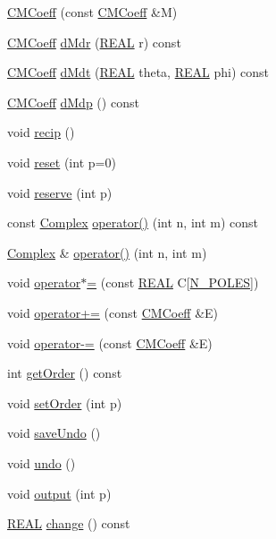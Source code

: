 \begin{DoxyCompactItemize}
\item 
\hyperlink{classCMCoeff_ae5a7fcbb8f989dbbff71d79738fd9356}{C\-M\-Coeff} (const \hyperlink{classCMCoeff}{C\-M\-Coeff} \&M)
\item 
\hyperlink{classCMCoeff}{C\-M\-Coeff} \hyperlink{classCMCoeff_aab926cdd2ef1a0f188f82603108296a8}{d\-Mdr} (\hyperlink{util_8h_a5821460e95a0800cf9f24c38915cbbde}{R\-E\-A\-L} r) const 
\item 
\hyperlink{classCMCoeff}{C\-M\-Coeff} \hyperlink{classCMCoeff_a2e9e6517ed48d1758af058f95b5af50c}{d\-Mdt} (\hyperlink{util_8h_a5821460e95a0800cf9f24c38915cbbde}{R\-E\-A\-L} theta, \hyperlink{util_8h_a5821460e95a0800cf9f24c38915cbbde}{R\-E\-A\-L} phi) const 
\item 
\hyperlink{classCMCoeff}{C\-M\-Coeff} \hyperlink{classCMCoeff_a3457ae837d9f8d250757fae3fd69c441}{d\-Mdp} () const 
\item 
void \hyperlink{classCMCoeff_a6e7e750022bf6a6f32dff9092881647c}{recip} ()
\item 
void \hyperlink{classCMCoeff_a5fc4a2ee0ab437bd601fd67ccc5bd43b}{reset} (int p=0)
\item 
void \hyperlink{classCMCoeff_a10d5db85d700255768d091c10fda818c}{reserve} (int p)
\item 
const \hyperlink{util_8h_a0ef19d29521fc1e3356ea268ba175cfc}{Complex} \hyperlink{classCMCoeff_a8776dd638fca3d95f813acb93c7896c7}{operator()} (int n, int m) const 
\item 
\hyperlink{util_8h_a0ef19d29521fc1e3356ea268ba175cfc}{Complex} \& \hyperlink{classCMCoeff_ad6668675df0fa31437bebee2a2b00e0f}{operator()} (int n, int m)
\item 
void \hyperlink{classCMCoeff_a63d33423be766832461e5e20a0f21f66}{operator$\ast$=} (const \hyperlink{util_8h_a5821460e95a0800cf9f24c38915cbbde}{R\-E\-A\-L} C\mbox{[}\hyperlink{mcoeff_8h_ac23f9c13c5d07d9ce386f7a830c35e5a}{N\-\_\-\-P\-O\-L\-E\-S}\mbox{]})
\item 
void \hyperlink{classCMCoeff_ac889bdd0230f6c3f11b8af06915410fe}{operator+=} (const \hyperlink{classCMCoeff}{C\-M\-Coeff} \&E)
\item 
void \hyperlink{classCMCoeff_a28161819e17994b61395e9ddc8532040}{operator-\/=} (const \hyperlink{classCMCoeff}{C\-M\-Coeff} \&E)
\item 
int \hyperlink{classCMCoeff_a4ca84260f5a63a33547ebce310b21c32}{get\-Order} () const 
\item 
void \hyperlink{classCMCoeff_a815a4d1f74b217ea54d9f05f6734004f}{set\-Order} (int p)
\item 
void \hyperlink{classCMCoeff_a99771333750460a0ba9c97f03bdaa6b9}{save\-Undo} ()
\item 
void \hyperlink{classCMCoeff_ae75856578c3de42f457cc6e2af17d1d4}{undo} ()
\item 
void \hyperlink{classCMCoeff_afe4e3e3719dc0808108353ab20b05c23}{output} (int p)
\item 
\hyperlink{util_8h_a5821460e95a0800cf9f24c38915cbbde}{R\-E\-A\-L} \hyperlink{classCMCoeff_a1bf2b3f4bba7f938a9d9d32855737699}{change} () const 
\end{DoxyCompactItemize}
